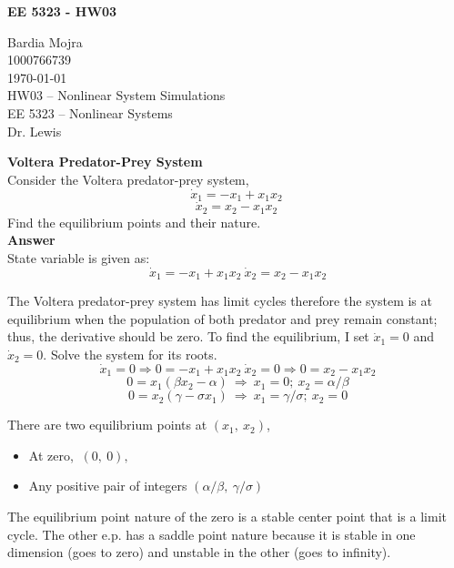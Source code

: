 \documentclass{homeworg}
\begin{document}
\begin{center}
\textbf{EE 5323 - HW03}\\
\end{center}

\noindent
Bardia Mojra\\
1000766739\\
\today\\
HW03 -- Nonlinear System Simulations\\
EE 5323 -- Nonlinear Systems\\
Dr. Lewis


\exercise
\noindent
\textbf{Voltera Predator-Prey System} \\
Consider the Voltera predator-prey system,\\
$$
\dot{x}_1 = - x_1 + x_1 x_2
$$
$$
\dot{x}_2 = x_2 -  x_1 x_2
$$
Find the equilibrium points and their nature.\\

\noindent
\textbf{Answer} \\
State variable is given as:
$$
~\dot{x}_1 = - x_1 + x_1 x_2
~\dot{x}_2 = x_2 -  x_1 x_2
$$

The Voltera predator-prey system has limit cycles therefore the system is
at equilibrium when the population of both predator and prey remain
constant; thus, the derivative should be zero.
To find the equilibrium, I set $\dot{x}_{1}=0$ and $\dot{x}_{2}=0$.
Solve the system for its roots.\\

$$
~\dot{x}_1 = 0 \Rightarrow 0 =  - x_1 + x_1 x_2
~\dot{x}_2 = 0 \Rightarrow 0 = x_2 -  x_1 x_2
$$
$$
~0 = x_1 (\beta x_2 - \alpha)~\Rightarrow~x_1 = 0 ; ~x_2 = \alpha/\beta
$$
$$~0 = x_2 (\gamma - \sigma x_1)~\Rightarrow~x_1 = \gamma/\sigma ; ~x_2 = 0
$$

There are two equilibrium points at $(x_1,~x_2)$,

\begin{itemize}
  \item At zero, $~(0 ,~ 0),$
  \item Any positive pair of integers $(\alpha/\beta,~\gamma/\sigma)$
\end{itemize}

The equilibrium point nature of the zero is a stable center point that is a
limit cycle. The other e.p. has a saddle point nature because it is stable
in one dimension (goes to zero) and unstable in the other (goes to
infinity).
\end{document}
